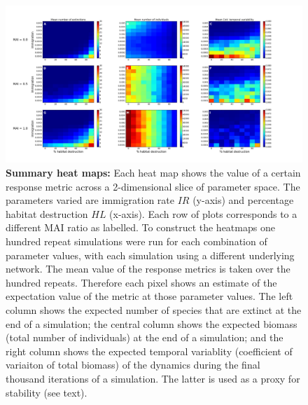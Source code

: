 \thispagestyle{empty}
\begin{figure}

		\centering      
		\hspace{-3cm}

        \includegraphics[width=\linewidth]{"./chapters/chapter04/figures/sum_maps_noveg"}
        \caption{\textbf{Summary heat maps:} Each heat map shows the value of a certain response metric across a 2-dimensional slice of parameter space. The parameters varied are immigration rate $IR$ (y-axis) and percentage habitat destruction $HL$ (x-axis). Each row of plots corresponds to a different MAI ratio as labelled. To construct the heatmaps one hundred repeat simulations were run for each combination of parameter values, with each simulation using a different underlying network. The mean value of the response metrics is taken over the hundred repeats. Therefore each pixel shows an estimate of the expectation value of the metric at those parameter values. The left column shows the expected number of species that are extinct at the end of a simulation; the central column shows the expected biomass (total number of individuals) at the end of a simulation; and the right column shows the expected temporal variablity (coefficient of variaiton of total biomass) of the dynamics during the final thousand iterations of a simulation. The latter is used as a proxy for stability (see text).}\label{fig:summary_heatmaps_imvshl_noveg}
\end{figure}
\clearpage
